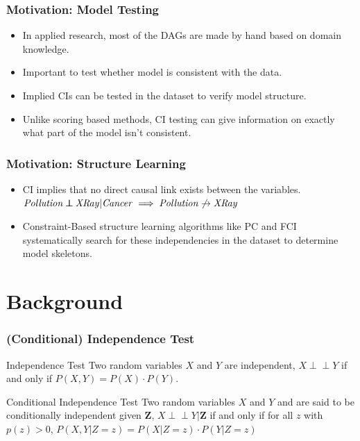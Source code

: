 \documentclass{beamer}
\def\ci{\perp\!\!\!\!\!\perp}
\begin{document}
\begin{frame}
	\frametitle{Motivation: Model Testing}
	\begin{itemize}
		\setlength\itemsep{1em}
		\item In applied research, most of the DAGs are made by hand
			based on domain knowledge.
		\item Important to test whether model is consistent with the data.
		\item Implied CIs can be tested in the dataset to verify
			model structure.
		\item Unlike scoring based methods, CI testing can give
			information on exactly what part of the model isn't
			consistent.
	\end{itemize}

\end{frame}

\begin{frame}
	\frametitle{Motivation: Structure Learning}
	\begin{itemize}
		\setlength\itemsep{1em}
		\item CI implies that no direct causal link exists between the variables. \newline
		\hspace*{20pt} $ \text{\emph{Pollution}} \ci \text{\emph{XRay}} | \text{\emph{Cancer}} \implies \text{\emph{Pollution}} \not \rightarrow  \text{\emph{XRay}} $


		\item Constraint-Based structure learning algorithms like PC
			and FCI systematically search for these independencies
			in the dataset to determine model skeletons.
	\end{itemize}
\end{frame}

\section{Background}
\begin{frame}
	\frametitle{(Conditional) Independence Test}
	\begin{block}{Independence Test}
		Two random variables $ X $ and $ Y $ are independent,
		$ X \ci Y $ if and only if $ P(X, Y) = P(X) \cdot P(Y) $.
	\end{block}
	\vspace{1em}

	\begin{block}{Conditional Independence Test} Two random variables $ X $
		and $ Y $ and are said to be conditionally independent given $
		\bm{Z} $, $ X \ci Y | \bm{Z} $ if and only if for all $ z $
		with $ p(z) > 0 $, $ P(X, Y | Z=z) = P(X | Z=z) \cdot P(Y |
		Z=z) $
	\end{block}
\end{frame}
\end{document}
